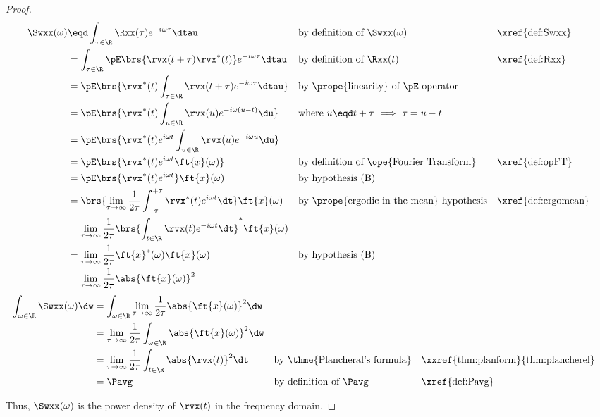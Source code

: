 \begin{proof}
\begin{align*}
   \Swxx(\omega)
     &\eqd \int_{\tau\in\R}\Rxx(\tau) e^{-i\omega\tau} \dtau
     &&    \text{by definition of $\Swxx(\omega)$}
     &&    \text{\xref{def:Swxx}}
   \\&=    \int_{\tau\in\R}\pE\brs{\rvx(t+\tau)\rvx^\ast(t)} e^{-i\omega\tau} \dtau
     &&    \text{by definition of $\Rxx(t)$}
     &&    \text{\xref{def:Rxx}}
   \\&=    \pE\brs{\rvx^\ast(t) \int_{\tau\in\R}\rvx(t+\tau) e^{-i\omega\tau} \dtau }
     &&    \text{by \prope{linearity} of $\pE$ operator}
   \\&=    \pE\brs{\rvx^\ast(t) \int_{u\in\R}\rvx(u) e^{-i\omega(u-t)} \du }
     &&    \text{where $u\eqd t+\tau$ $\implies$ $\tau=u-t$}
   \\&=    \pE\brs{\rvx^\ast(t)e^{i\omega t} \int_{u\in\R}\rvx(u) e^{-i\omega u} \du }
   \\&=    \pE\brs{\rvx^\ast(t)e^{i\omega t} \ft{x}(\omega) }
     &&    \text{by definition of \ope{Fourier Transform}}
     &&    \text{\xref{def:opFT}}
   \\&=    \pE\brs{\rvx^\ast(t)e^{i\omega t}} \ft{x}(\omega)
     &&    \text{by hypothesis (B)}
   \\&=    \brs{\lim_{\tau\to\infty}\frac{1}{2\tau}\int_{-\tau}^{+\tau} \rvx^\ast(t)e^{i\omega t} \dt} \ft{x}(\omega)
     &&    \text{by \prope{ergodic in the mean} hypothesis}
     &&    \text{\xref{def:ergomean}}
   \\&=    \lim_{\tau\to\infty}\frac{1}{2\tau}\brs{\int_{t\in\R}\rvx(t)e^{-i\omega t} \dt}^\ast \ft{x}(\omega)
   \\&=    \lim_{\tau\to\infty}\frac{1}{2\tau} \ft{x}^\ast(\omega) \ft{x}(\omega)
     &&    \text{by hypothesis (B)}
   \\&=    \lim_{\tau\to\infty}\frac{1}{2\tau} \abs{\ft{x}(\omega)}^2
\end{align*}
\begin{align*}
   \int_{\omega\in\R} \Swxx(\omega) \dw
     &= \int_{\omega\in\R} \lim_{\tau\to\infty}\frac{1}{2\tau} \abs{\ft{x}(\omega)}^2 \dw
   \\&= \lim_{\tau\to\infty}\frac{1}{2\tau} \int_{\omega\in\R} \abs{\ft{x}(\omega)}^2 \dw
   \\&= \lim_{\tau\to\infty}\frac{1}{2\tau} \int_{t\in\R} \abs{\rvx(t)}^2 \dt
     && \text{by \thme{Plancheral's formula}}
     && \text{\xxref{thm:planform}{thm:plancherel}}
   \\&= \Pavg
     && \text{by definition of $\Pavg$}
     && \text{\xref{def:Pavg}}
\end{align*}

Thus, $\Swxx(\omega)$ is the power density of $\rvx(t)$ in the frequency domain.
\end{proof}


